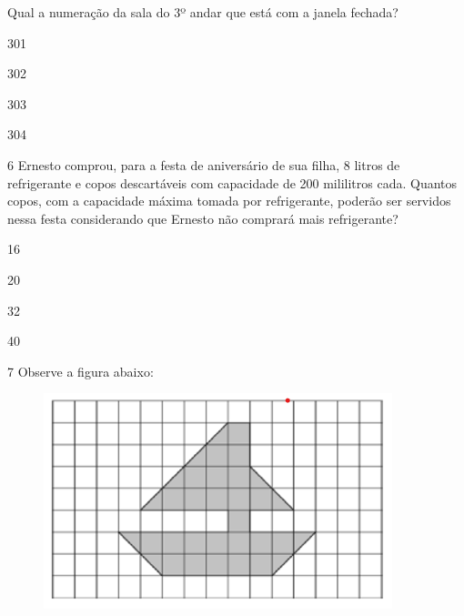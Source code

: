 Qual a numeração da sala do 3º andar que está com a janela fechada?

\begin{minipage}{.5\textwidth}
\begin{escolha}
\item
  301
\item
  302
\item
  303
\item
  304
\end{escolha}
\end{minipage}

\num{6} Ernesto comprou, para a festa de aniversário de sua filha, 
8 litros de refrigerante e copos descartáveis com capacidade de 200
mililitros cada. Quantos copos, com a capacidade máxima tomada por
refrigerante, poderão ser servidos nessa festa considerando que Ernesto 
não comprará mais refrigerante?

\begin{minipage}{.5\textwidth}
\begin{escolha}
\item
  16
\item
  20
\item
  32
\item
  40
\end{escolha}
\end{minipage}

\num{7} Observe a figura abaixo:

\begin{figure}[htpb!]
\includegraphics[width=.8\textwidth]{./imgs/mat19.png}
\end{figure}

